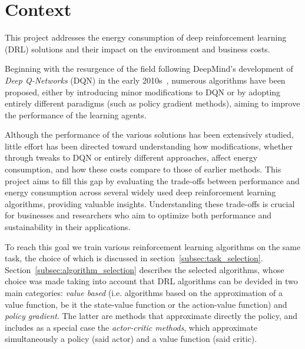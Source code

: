 \section{Context}
\label{sec:context}
This project addresses the energy consumption of deep reinforcement learning (DRL) solutions and their impact on the environment and business costs.

Beginning with the resurgence of the field following DeepMind's development of \emph{Deep Q-Networks} (DQN) in the early 2010s~\cite{mnih:atari}\cite{mnih:human}, numerous algorithms have been proposed, either by introducing minor modifications to DQN or by adopting entirely different paradigms (such as policy gradient methods), aiming to improve the performance of the learning agents.

Although the performance of the various solutions has been extensively studied, little effort has been directed toward understanding how modifications, whether through tweaks to DQN or entirely different approaches, affect energy consumption, and how these costs compare to those of earlier methods.
This project aims to fill this gap by evaluating the trade-offs between performance and energy consumption across several widely used deep reinforcement learning algorithms, providing valuable insights. Understanding these trade-offs is crucial for businesses and researchers who aim to optimize both performance and sustainability in their applications.

To reach this goal we train various reinforcement learning algorithms on the same task, the choice of which is discussed in section~\vref{subsec:task_selection}. Section~\vref{subsec:algorithm_selection} describes the selected algorithms, whose choice was made taking into account that DRL algorithms can be devided in two main categories: \textit{value based} (i.e. algorithms based on the approximation of a value function, be it the state-value function or the action-value function) and \textit{policy gradient}. The latter are methods that approximate directly the policy, and includes as a special case the \textit{actor-critic methods}, which approximate simultaneously a policy (said actor) and a value function (said critic).